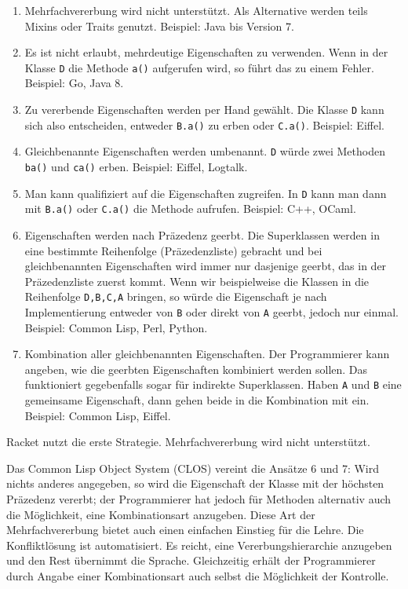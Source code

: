 \begin{enumerate}
 \item Mehrfachvererbung wird nicht unterstützt. Als Alternative werden teils Mixins oder Traits genutzt. Beispiel: Java bis Version 7.
 \item Es ist nicht erlaubt, mehrdeutige Eigenschaften zu verwenden. Wenn in der Klasse \texttt{D} die Methode \texttt{a()} aufgerufen wird, so führt das zu einem Fehler. Beispiel: Go, Java 8.
 \item Zu vererbende Eigenschaften werden per Hand gewählt. Die Klasse \texttt{D} kann sich also entscheiden, entweder \texttt{B.a()} zu erben oder \texttt{C.a()}. Beispiel: Eiffel.
 \item Gleichbenannte Eigenschaften werden umbenannt. \texttt{D} würde zwei Methoden \texttt{ba()} und \texttt{ca()} erben. Beispiel: Eiffel, Logtalk.
 \item Man kann qualifiziert auf die Eigenschaften zugreifen. In \texttt{D} kann man dann mit \texttt{B.a()} oder \texttt{C.a()} die Methode aufrufen. Beispiel: C++, OCaml.
 \item Eigenschaften werden nach Präzedenz geerbt. Die Superklassen werden in eine bestimmte Reihenfolge (Präzedenzliste) gebracht und bei gleichbenannten Eigenschaften wird immer nur dasjenige geerbt, das in der Präzedenzliste zuerst kommt. Wenn wir beispielweise die Klassen in die Reihenfolge \texttt{D,B,C,A} bringen, so würde die Eigenschaft je nach Implementierung entweder von \texttt{B} oder direkt von \texttt{A} geerbt, jedoch nur einmal. Beispiel: Common Lisp, Perl, Python.
 \item Kombination aller gleichbenannten Eigenschaften. Der Programmierer kann angeben, wie die geerbten Eigenschaften kombiniert werden sollen. Das funktioniert gegebenfalls sogar für indirekte Superklassen. Haben \texttt{A} und \texttt{B} eine gemeinsame Eigenschaft, dann gehen beide in die Kombination mit ein. Beispiel: Common Lisp, Eiffel.
\end{enumerate}


Racket nutzt die erste Strategie. Mehrfachvererbung wird nicht unterstützt.

Das Common Lisp Object System (CLOS) \cite{keene} vereint die Ansätze 6 und 7: Wird nichts anderes angegeben, so wird die Eigenschaft der Klasse mit der höchsten Präzedenz vererbt; der Programmierer hat jedoch für Methoden alternativ auch die Möglichkeit, eine Kombinationsart anzugeben. Diese Art der Mehrfachvererbung bietet auch einen einfachen Einstieg für die Lehre. Die Konfliktlösung ist automatisiert. Es reicht, eine Vererbungshierarchie anzugeben und den Rest übernimmt die Sprache. Gleichzeitig erhält der Programmierer durch Angabe einer Kombinationsart auch selbst die Möglichkeit der Kontrolle.

